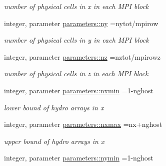 \begin{DoxyCompactItemize}
\begin{DoxyCompactList}\small\item\em number of physical cells in x in each M\+P\+I block \end{DoxyCompactList}\item 
\hypertarget{namespaceparameters_ab73091bd318f7d283d05a362acdcf146}{}integer, parameter \hyperlink{namespaceparameters_ab73091bd318f7d283d05a362acdcf146}{parameters\+::ny} =nytot/mpirow\label{namespaceparameters_ab73091bd318f7d283d05a362acdcf146}

\begin{DoxyCompactList}\small\item\em number of physical cells in y in each M\+P\+I block \end{DoxyCompactList}\item 
\hypertarget{namespaceparameters_a743b8648645c72aff60188bf8b87f10a}{}integer, parameter \hyperlink{namespaceparameters_a743b8648645c72aff60188bf8b87f10a}{parameters\+::nz} =nztot/mpirowz\label{namespaceparameters_a743b8648645c72aff60188bf8b87f10a}

\begin{DoxyCompactList}\small\item\em number of physical cells in z in each M\+P\+I block \end{DoxyCompactList}\item 
\hypertarget{namespaceparameters_a19bcd2dc8bcf4a1be3db412ccca70308}{}integer, parameter \hyperlink{namespaceparameters_a19bcd2dc8bcf4a1be3db412ccca70308}{parameters\+::nxmin} =1-\/nghost\label{namespaceparameters_a19bcd2dc8bcf4a1be3db412ccca70308}

\begin{DoxyCompactList}\small\item\em lower bound of hydro arrays in x \end{DoxyCompactList}\item 
\hypertarget{namespaceparameters_ac65196ab662a1d7a4485ff3db2092304}{}integer, parameter \hyperlink{namespaceparameters_ac65196ab662a1d7a4485ff3db2092304}{parameters\+::nxmax} =nx+nghost\label{namespaceparameters_ac65196ab662a1d7a4485ff3db2092304}

\begin{DoxyCompactList}\small\item\em upper bound of hydro arrays in x \end{DoxyCompactList}\item 
\hypertarget{namespaceparameters_a907a8edcef1c67359c2f593a4a23f768}{}integer, parameter \hyperlink{namespaceparameters_a907a8edcef1c67359c2f593a4a23f768}{parameters\+::nymin} =1-\/nghost\label{namespaceparameters_a907a8edcef1c67359c2f593a4a23f768}


\end{DoxyCompactItemize}
